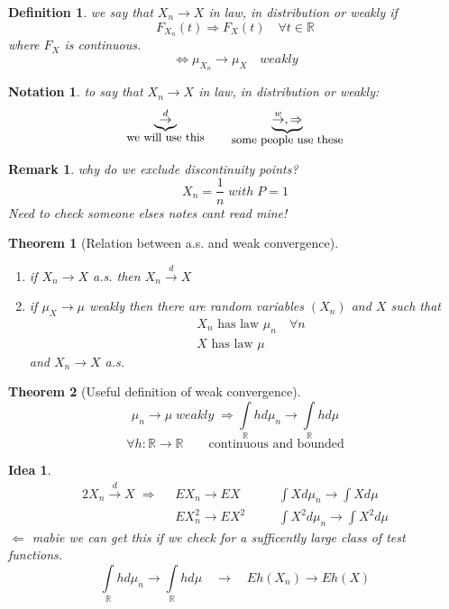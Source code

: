 \documentclass[12pt]{article}
\def\RR{\mathbb{R}}
\newtheorem{theorem}{Theorem}[section]
\newtheorem{definition}{Definition}[section]
\newtheorem*{remark}{Remark}
\newtheorem*{idea}{Idea}
\newtheorem*{notation}{Notation}
\begin{document}
\begin{definition}
we say that $X_n \rightarrow X$ in law, in distribution or weakly if 
\[F_{X_n}(t) \Rightarrow F_X(t) \quad \forall t \in \RR\]
where $F_X$ is continuous. 
\[\Leftrightarrow \mu_{X_n} \rightarrow \mu_X \quad weakly\]
\end{definition} 

\begin{notation} to say that $X_n \rightarrow X$ in law, in distribution or weakly:
 \[\underbrace{\overset{d}{\rightarrow}}_{\text{\small we will use this}} \qquad \underbrace{\overset{w}{\rightarrow}, \Rightarrow}_{\text{\small some people use these}}\]
\end{notation}

\begin{remark}
why do we exclude discontinuity points?
\[X_n = \frac{1}{n} \; with \; P=1\]
Need to check someone elses notes cant read mine!
\end{remark}

\begin{theorem}[Relation between a.s. and weak convergence]\label{weak1}\quad \\
\begin{enumerate}
\item if $X_n\rightarrow X$ a.s. then $X_n\overset{d}{\rightarrow} X$
\item if $\mu_X \rightarrow \mu$ weakly then there are random variables $(X_n)$ and $X$ such that
\begin{align*} &X_n\text{ has law }\mu_n \quad \forall n\\ &X\text{ has law }\mu \end{align*}
and $X_n \rightarrow X$ a.s.
\end{enumerate}
\end{theorem}
\begin{theorem}[Useful definition of weak convergence]\label{weak2}
\[\mu_n \rightarrow \mu \;weakly \; \Rightarrow \int\limits_{\RR}hd\mu_n \rightarrow \int\limits_{\RR}hd\mu \]
\[\forall h:\RR \rightarrow \RR \qquad \text{continuous and bounded}\]
\end{theorem}

\begin{idea}
\begin{alignat*}{2}
X_n \overset{d}{\rightarrow} X \; \Rightarrow \; \; &EX_n \rightarrow EX & \quad &\int Xd\mu_n \rightarrow \int Xd\mu \\
&EX_n^2 \rightarrow EX^2 & \quad &\int X^2 d\mu_n \rightarrow \int X^2 d\mu \end{alignat*}
$\Leftarrow$ mabie we can get this if we check for a sufficently large class of test functions.
\[\boxed{\int\limits_{\RR}hd\mu_n \rightarrow \int\limits_{\RR}hd\mu} \quad \rightarrow \quad  Eh(X_n) \rightarrow Eh(X)\]
\end{idea}
\end{document}
